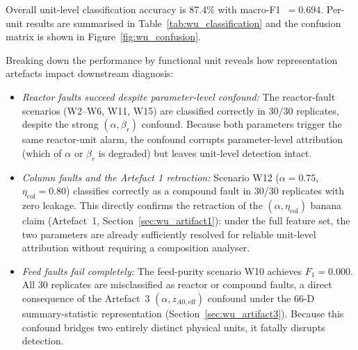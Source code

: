 \documentclass[aps,pre,twocolumn,superscriptaddress]{revtex4-2}
\begin{document}
Overall unit-level classification accuracy is 87.4\% with macro-F1~$= 0.694$. Per-unit results are summarised in Table~\ref{tab:wu_classification} and the
confusion matrix is shown in Figure~\ref{fig:wu_confusion}.

Breaking down the performance by functional unit reveals how representation 
artefacts impact downstream diagnosis:
\begin{itemize}
    \item \textit{Reactor faults succeed despite parameter-level confound:} 
    The reactor-fault scenarios (W2--W6, W11, W15) are classified correctly
    in 30/30 replicates, despite the strong $(\alpha, \beta_r)$ confound.
    Because both parameters trigger the same reactor-unit alarm, the confound 
    corrupts parameter-level attribution (which of $\alpha$ or $\beta_r$ is degraded) 
    but leaves unit-level detection intact.
    
    \item \textit{Column faults and the Artefact 1 retraction:} 
    Scenario W12 ($\alpha=0.75$, $\eta_\mathrm{col}=0.80$) classifies correctly as
    a compound fault in 30/30 replicates with zero leakage. This directly
    confirms the retraction of the $(\alpha, \eta_\mathrm{col})$ banana claim
    (Artefact~1, Section~\ref{sec:wu_artifact1}): under the full feature set,
    the two parameters are already sufficiently resolved for reliable unit-level
    attribution without requiring a composition analyser.
    
    \item \textit{Feed faults fail completely:} 
    The feed-purity scenario W10 achieves $F_1 = 0.000$. All 30 replicates are
    misclassified as reactor or compound faults, a direct consequence of the
    Artefact~3 $(\alpha, z_{A0,\mathrm{eff}})$ confound under the 66-D summary-statistic
    representation (Section~\ref{sec:wu_artifact3}). Because this confound bridges 
    two entirely distinct physical units, it fatally disrupts detection.
\end{itemize}
\end{document}
